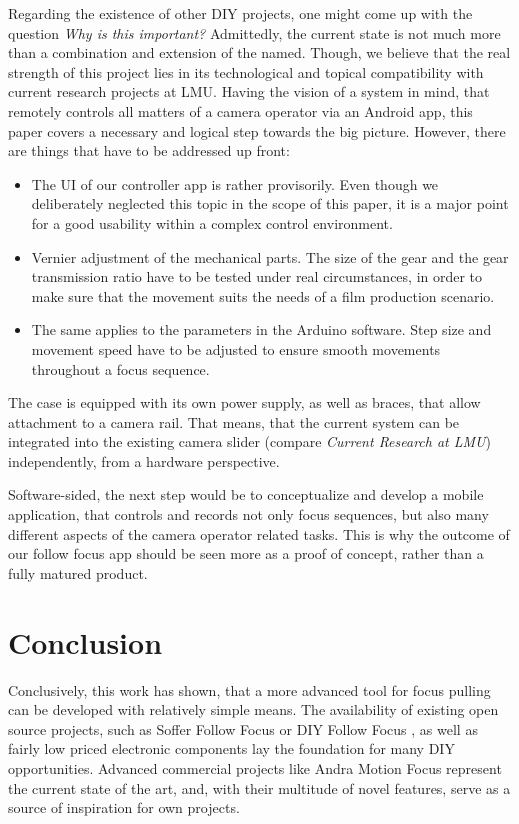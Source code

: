 \documentclass{sigchi}
\begin{document}
Regarding the existence of other DIY projects, one might come up with the question \textit{Why is this important?} Admittedly, the current state is not much more than a combination and extension of the named. Though, we believe that the real strength of this project lies in its technological and topical compatibility with current research projects at LMU. Having the vision of a system in mind, that remotely controls all matters of a camera operator via an Android app, this paper covers a necessary and logical step towards the big picture. 
However, there are things that have to be addressed up front: 
\begin{itemize}
  \item The UI of our controller app is rather provisorily. Even though we deliberately neglected this topic in the scope of this paper, it is a major point for a good usability within a complex control environment.
  \item Vernier adjustment of the mechanical parts. The size of the gear and the gear transmission ratio have to be tested under real circumstances, in order to make sure that the movement suits the needs of a film production scenario.
  \item The same applies to the parameters in the Arduino software. Step size and movement speed have to be adjusted to ensure smooth movements throughout a focus sequence.
\end{itemize}

The case is equipped with its own power supply, as well as braces, that allow attachment to a camera rail. That means, that the current system can be integrated into the existing camera slider (compare \textit{Current Research at LMU}) independently, from a hardware perspective. 

Software-sided, the next step would be to conceptualize and develop a mobile application, that controls and records not only focus sequences, but also many different aspects of the camera operator related tasks. This is why the outcome of our follow focus app should be seen more as a proof of concept, rather than a fully matured product.


\section{Conclusion}

Conclusively, this work has shown, that a more advanced tool for focus pulling can be developed with relatively simple means. The availability of existing open source projects, such as Soffer Follow Focus \cite{soffer} or DIY Follow Focus \cite{diyff}, as well as fairly low priced electronic components lay the foundation for many DIY opportunities. Advanced commercial projects like Andra Motion Focus \cite{andra} represent the current state of the art, and, with their multitude of novel features, serve as a source of inspiration for own projects.



\end{document}
